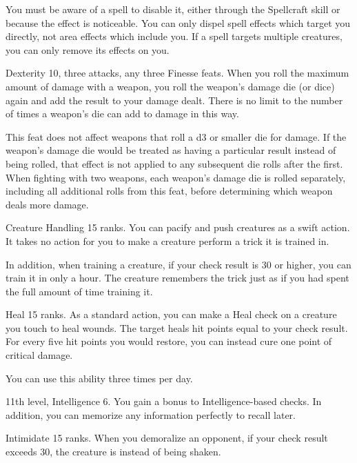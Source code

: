 You must be aware of a spell to disable it, either through the Spellcraft skill or because the effect is noticeable.
You can only dispel spell effects which target you directly, not area effects which include you.
If a spell targets multiple creatures, you can only remove its effects on you.

\featpres Dexterity 10, three attacks, any three Finesse feats.
\featben When you roll the maximum amount of damage with a weapon, you roll the weapon's damage die (or dice) again and add the result to your damage dealt.
There is no limit to the number of times a weapon's die can add to damage in this way.

This feat does not affect weapons that roll a d3 or smaller die for damage.
If the weapon's damage die would be treated as having a particular result instead of being rolled, that effect is not applied to any subsequent die rolls after the first.
When fighting with two weapons, each weapon's damage die is rolled separately, including all additional rolls from this feat, before determining which weapon deals more damage.

\featpre Creature Handling 15 ranks.
\featben You can pacify and push creatures as a swift action.
It takes no action for you to make a creature perform a trick it is trained in.

In addition, when training a creature, if your check result is 30 or higher, you can train it in only a hour.
The creature remembers the trick just as if you had spent the full amount of time training it.

\featpre Heal 15 ranks.
\featben As a standard action, you can make a Heal check on a creature you touch to heal wounds.
The target heals hit points equal to your check result.
For every five hit points you would restore, you can instead cure one point of critical damage.

You can use this ability three times per day.

\featpres 11th level, Intelligence 6.
\featben You gain a  bonus to Intelligence-based checks.
In addition, you can memorize any information perfectly to recall later.

\featpre Intimidate 15 ranks.
\featben When you demoralize an opponent, if your check result exceeds 30, the creature is \panicked instead of being shaken.

